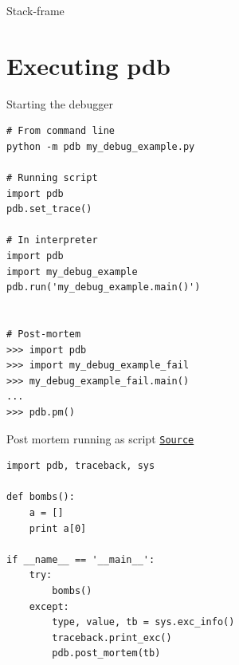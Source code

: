 \documentclass[
    size=20pt,
    style=sailor,
    display=slides,
    paper=smartboard,
    orient=landscape,
]{powerdot}
\begin{document}
\begin{slide}[method=file]{Stack-frame}
\begin{figure}[h!tb]
{    }
    \vspace{-4cm}
    \vspace{-4cm}
   \end{figure}
\end{slide}


\section{Executing pdb}


\begin{slide}[method=file]{Starting the debugger}
   \begin{verbatim}
# From command line
python -m pdb my_debug_example.py

# Running script
import pdb
pdb.set_trace()

# In interpreter
import pdb
import my_debug_example
pdb.run('my_debug_example.main()')


# Post-mortem
>>> import pdb
>>> import my_debug_example_fail
>>> my_debug_example_fail.main()
...
>>> pdb.pm()

  \end{verbatim}
\end{slide}


\begin{slide}[method=file]{Post mortem running as script}
\href{http://stackoverflow.com/questions/242485/starting-python-debugger-automatically-on-error}{
\texttt{Source}}
   \begin{verbatim}
import pdb, traceback, sys

def bombs():
    a = []
    print a[0]

if __name__ == '__main__':
    try:
        bombs()
    except:
        type, value, tb = sys.exc_info()
        traceback.print_exc()
        pdb.post_mortem(tb)
  \end{verbatim}
\end{slide}
\end{document}
